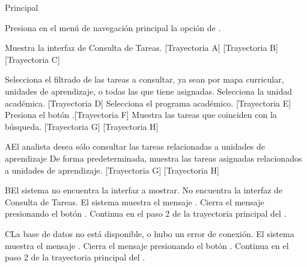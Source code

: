 \begin{UCtrayectoria}{Principal}
    
    \UCpaso[\UCactor] Presiona en el menú de navegación principal la opción de .
    
    \UCpaso Muestra la interfaz de Consulta de Tareas. [Trayectoria A] [Trayectoria B] [Trayectoria C]

    \UCpaso[\UCactor] Selecciona el filtrado de las tareas a consultar, ya sean por mapa curricular, unidades de aprendizaje, o todas las que tiene asignadas.
    \UCpaso[\UCactor] Selecciona la unidad académica. [Trayectoria D]
    \UCpaso[\UCactor] Selecciona el programa académico. [Trayectoria E]
    \UCpaso[\UCactor] Presiona el botón .[Trayectoria F]
    \UCpaso Muestra las tareas que coinciden con la búsqueda. [Trayectoria G] [Trayectoria H] 
    
    
\end{UCtrayectoria}


\begin{UCtrayectoriaA}{A}{El analista desea sólo consultar las tareas relacionadas a unidades de aprendizaje}
	\UCpaso De forma predeterminada, muestra las tareas asignadas relacionados a unidades de aprendizaje. [Trayectoria G] [Trayectoria H] 
\end{UCtrayectoriaA}


\begin{UCtrayectoriaA}{B}{El sistema no encuentra la interfaz a mostrar.}
	\UCpaso No encuentra la interfaz de Consulta de Tareas.
    \UCpaso El sistema muestra el mensaje .
    \UCpaso[\UCactor] Cierra el mensaje presionando el botón .
    \UCpaso Continua en el paso 2 de la trayectoria principal del .
\end{UCtrayectoriaA}


\begin{UCtrayectoriaA}{C}{La base de datos no está disponible, o hubo un error de conexión.}
    \UCpaso El sistema muestra el mensaje .
    \UCpaso[\UCactor] Cierra el mensaje presionando el botón .
    \UCpaso Continua en el paso 2 de la trayectoria principal del .
\end{UCtrayectoriaA}

